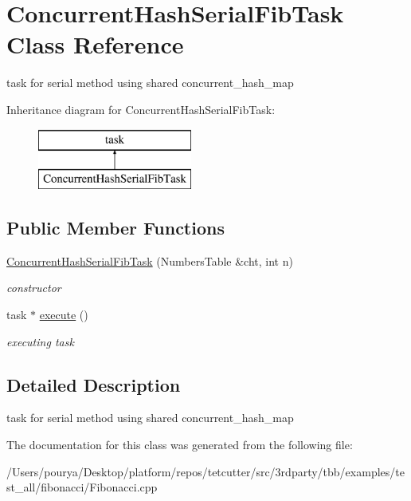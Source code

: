 \hypertarget{classConcurrentHashSerialFibTask}{}\section{Concurrent\+Hash\+Serial\+Fib\+Task Class Reference}
\label{classConcurrentHashSerialFibTask}


task for serial method using shared concurrent\+\_\+hash\+\_\+map  


Inheritance diagram for Concurrent\+Hash\+Serial\+Fib\+Task\+:\begin{figure}[H]
\begin{center}
\leavevmode
\includegraphics[height=2.000000cm]{classConcurrentHashSerialFibTask}
\end{center}
\end{figure}
\subsection*{Public Member Functions}
\begin{DoxyCompactItemize}
\item 
\hypertarget{classConcurrentHashSerialFibTask_affbce6f00f76a5e009dd5763f136cb09}{}\hyperlink{classConcurrentHashSerialFibTask_affbce6f00f76a5e009dd5763f136cb09}{Concurrent\+Hash\+Serial\+Fib\+Task} (Numbers\+Table \&cht, int n)\label{classConcurrentHashSerialFibTask_affbce6f00f76a5e009dd5763f136cb09}

\begin{DoxyCompactList}\small\item\em constructor \end{DoxyCompactList}\item 
\hypertarget{classConcurrentHashSerialFibTask_a910f950889e942f6d98a1358fc8374ab}{}task $\ast$ \hyperlink{classConcurrentHashSerialFibTask_a910f950889e942f6d98a1358fc8374ab}{execute} ()\label{classConcurrentHashSerialFibTask_a910f950889e942f6d98a1358fc8374ab}

\begin{DoxyCompactList}\small\item\em executing task \end{DoxyCompactList}\end{DoxyCompactItemize}


\subsection{Detailed Description}
task for serial method using shared concurrent\+\_\+hash\+\_\+map 

The documentation for this class was generated from the following file\+:\begin{DoxyCompactItemize}
\item 
/\+Users/pourya/\+Desktop/platform/repos/tetcutter/src/3rdparty/tbb/examples/test\+\_\+all/fibonacci/Fibonacci.\+cpp\end{DoxyCompactItemize}
